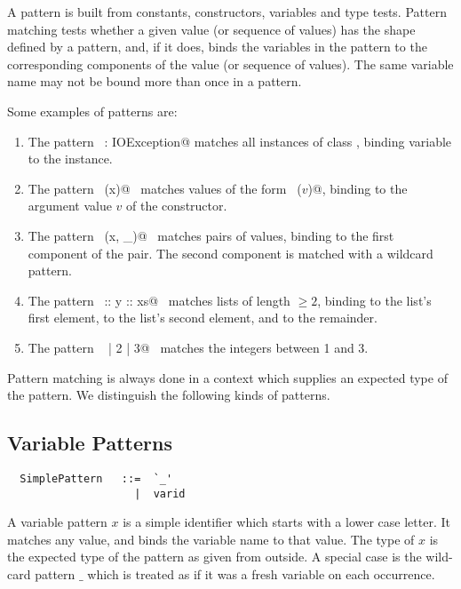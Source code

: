 
A pattern is built from constants, constructors, variables and type
tests. Pattern matching tests whether a given value (or sequence of values)
has the shape defined by a pattern, and, if it does, binds the
variables in the pattern to the corresponding components of the value
(or sequence of values).  The same variable name may not be bound more
than once in a pattern.

\example Some examples of patterns are:
\begin{enumerate}
\item
The pattern ~\lstinline@ex: IOException@ matches all instances of class
\lstinline@IOException@, binding variable \verb@ex@ to the instance.
\item
The pattern ~\lstinline@Some(x)@~ matches values of the form ~\lstinline@Some($v$)@,
binding \lstinline@x@ to the argument value $v$ of the  constructor.
\item
The pattern ~\lstinline@(x, _)@~ matches pairs of values, binding \lstinline@x@ to
the first component of the pair. The second component is matched
with a wildcard pattern.
\item
The pattern ~\lstinline@x :: y :: xs@~ matches lists of length $\geq 2$,
binding \lstinline@x@ to the list's first element, \lstinline@y@ to the list's
second element, and \lstinline@xs@ to the remainder.
\item
The pattern ~ | 2 | 3@~ matches the integers between 1 and 3.
\end{enumerate}

Pattern matching is always done in a context which supplies an
expected type of the pattern. We distinguish the following kinds of
patterns.

\subsection{Variable Patterns}

\syntax\begin{lstlisting}
  SimplePattern   ::=  `_'
                    |  varid
\end{lstlisting}

A variable pattern $x$ is a simple identifier which starts with a
lower case letter.  It matches any value, and binds the variable name
to that value.  The type of $x$ is the expected type of the pattern as
given from outside.  A special case is the wild-card pattern $\_$
which is treated as if it was a fresh variable on each occurrence.

